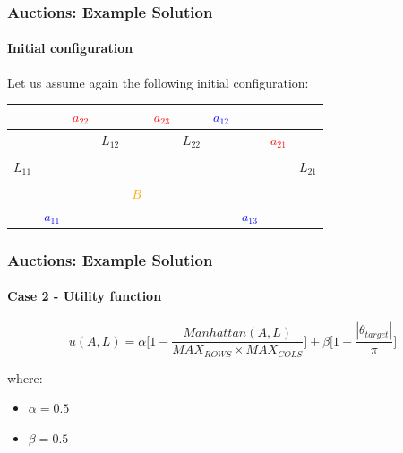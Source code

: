 \begin{frame}
	\frametitle{Auctions: Example Solution}
	\framesubtitle{Initial configuration}
	
	\large
	
	\vspace{0.5cm}
	
	Let us assume again the following initial configuration:
	
	\begin{table}[!h]
		\centering
		\setlength\tabcolsep{7pt}
		\def\arraystretch{1.3}
		\begin{tabular}{|c|c|c|c|c|c|c|c|c|c|c|}
			\hline
			&  & \textcolor{red}{$ a_{22} $} & & & \textcolor{red}{$ a_{23} $} &  & \textcolor{blue}{$ a_{12} $} &  &  &  \\ \hline
			
			&  &  & $ L_{12} $ &  &  & $ L_{22} $ &  & & \textcolor{red}{$ a_{21} $} & \\ \hline
			
			&  &  &  &  &  &  &  &  &  & \\ \hline
			
			$ L_{11} $ &  &  &  &  &  &  &  &  &  & $ L_{21} $ \\ \hline
			
			&  &  &  &  &  &  &  &  &  & \\ \hline
			
			&  &  &  & \textcolor{orange}{$ B $} &  &  &  &  & &  \\ \hline
			
			& \textcolor{blue}{$ a_{11} $} &  &  &  &  &  & & \textcolor{blue}{$ a_{13} $} &  & \\ \hline
		\end{tabular}
	\end{table}
\end{frame}

\begin{frame}
	\frametitle{Auctions: Example Solution}
	\framesubtitle{Case 2 - Utility function}
	
	\large
	
	\vspace{0.5cm}
	
	\begin{equation*}
		u(A,L) = \alpha \Big [ 1 - \frac{Manhattan(A,L)}{MAX_{ROWS} \times MAX_{COLS}} \Big ] + \beta \Big [ 1 - \frac{| \theta_{target} |}{\pi} \Big ]
	\end{equation*}
	
	\vspace{0.3cm}
	
	where:
	
	\begin{itemize}
		\item $ \alpha = 0.5 $
		\item $ \beta = 0.5 $
	\end{itemize}
\end{frame}

